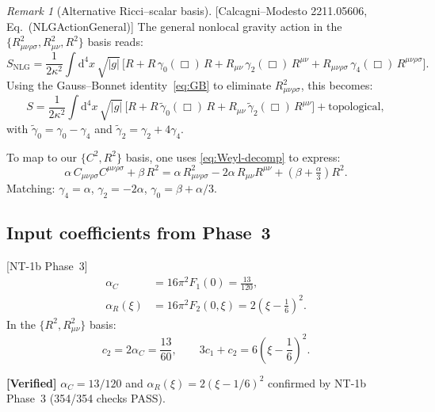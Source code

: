 \documentclass[12pt,a4paper]{article}
\theoremstyle{definition}
\theoremstyle{remark}
\newtheorem{remark}[proposition]{Remark}
\newcommand{\Ricsq}{R_{\mu\nu}R^{\mu\nu}}
\newcommand{\Weylsq}{C_{\mu\nu\rho\sigma}C^{\mu\nu\rho\sigma}}
\newcommand{\dd}{\mathrm{d}}
\newcommand{\fromlit}[1]{\textcolor{blue!70!black}{\textsf{[#1]}}}
\newcommand{\verified}[1]{%
  \par\smallskip\noindent
  \colorbox{green!10}{\parbox{\dimexpr\linewidth-2\fboxsep}{%
    \textcolor{green!50!black}{\textbf{[Verified]}} #1}}%
  \par\smallskip}
\begin{document}
\begin{remark}[Alternative Ricci--scalar basis]
\label{rem:alt-basis}
\fromlit{Calcagni--Modesto 2211.05606, Eq.~(NLGActionGeneral)}
The general nonlocal gravity action in the
$\{R_{\mu\nu\rho\sigma}^2, R_{\mu\nu}^2, R^2\}$ basis reads:
\begin{equation}\label{eq:NLG-general}
  S_{\mathrm{NLG}} = \frac{1}{2\kappa^2}\int\dd^4 x\,\sqrt{|g|}\,
  \big[
    R + R\,\gamma_0(\Box)\,R
    + R_{\mu\nu}\,\gamma_2(\Box)\,R^{\mu\nu}
    + R_{\mu\nu\rho\sigma}\,\gamma_4(\Box)\,R^{\mu\nu\rho\sigma}
  \big].
\end{equation}
Using the Gauss--Bonnet identity~\eqref{eq:GB} to eliminate
$R_{\mu\nu\rho\sigma}^2$, this becomes:
\begin{equation}
  S = \frac{1}{2\kappa^2}\int\dd^4 x\,\sqrt{|g|}\,
  \big[
    R + R\,\tilde{\gamma}_0(\Box)\,R
    + R_{\mu\nu}\,\tilde{\gamma}_2(\Box)\,R^{\mu\nu}
  \big]
  + \text{topological},
\end{equation}
with $\tilde{\gamma}_0 = \gamma_0 - \gamma_4$ and
$\tilde{\gamma}_2 = \gamma_2 + 4\gamma_4$.

To map to our $\{C^2, R^2\}$ basis, one uses
\eqref{eq:Weyl-decomp} to express:
\begin{equation}\label{eq:basis-map}
  \alpha\,\Weylsq + \beta\,R^2
  = \alpha\,R_{\mu\nu\rho\sigma}^2
  - 2\alpha\,\Ricsq
  + \left(\beta + \tfrac{\alpha}{3}\right)R^2.
\end{equation}
Matching: $\gamma_4 = \alpha$, $\gamma_2 = -2\alpha$,
$\gamma_0 = \beta + \alpha/3$.
\end{remark}


\subsection{Input coefficients from Phase~3}

\fromlit{NT-1b Phase~3}
\begin{align}
  \alpha_C &= 16\pi^2 F_1(0) = \frac{13}{120},
  \label{eq:alpha_C}\\
  \alpha_R(\xi) &= 16\pi^2 F_2(0,\xi) = 2\left(\xi-\frac{1}{6}\right)^2.
  \label{eq:alpha_R}
\end{align}
In the $\{R^2, R_{\mu\nu}^2\}$ basis:
\begin{equation}\label{eq:c1c2}
  c_2 = 2\alpha_C = \frac{13}{60}, \qquad
  3c_1 + c_2 = 6\left(\xi-\frac{1}{6}\right)^2.
\end{equation}

\verified{$\alpha_C = 13/120$ and $\alpha_R(\xi) = 2(\xi-1/6)^2$
confirmed by NT-1b Phase~3 (354/354 checks PASS).}
\end{document}
